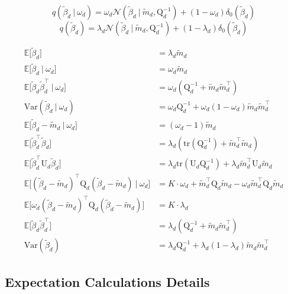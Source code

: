 \documentclass[twoside,11pt]{article}
\newcommand\given[1][]{\:#1\vert\:}
\newcommand{\transpose}[1]{#1^{\intercal}}
\newcommand{\E}{\mathbb{E}}
\newcommand{\betad}{\tilde{\beta}_d}
\newcommand{\umat}{\mathrm{U}}
\newcommand{\qmat}{\mathrm{Q}}
\newcommand{\qbeta}{\mathcal{N} \left( \betad \given \tilde{m}_d, \qmat_d^{-1} \right)}
\newcommand{\trace}[1]{\mathrm{tr} \left( #1 \right)}
\newcommand{\var}[1]{\mathrm{Var}\left(#1\right)}
\begin{document}
\begin{equation} \label{eq:qbeta_omega}
	q(\betad \given \omega_d) = \omega_d \qbeta + (1 - \omega_d) \delta_0(\betad)
\end{equation}
\begin{equation}  \label{eq:qbeta_marginal}
	q(\betad) = \lambda_d \qbeta + (1 - \lambda_d) \delta_0(\betad)
\end{equation}

\begin{align*}
	\E \Big[ \betad \Big] &= \lambda_d \tilde{m}_d \\
	\E \Big[ \betad \given \omega_d \Big] &=  \omega_d \tilde{m}_d \\
	\E \Big[ \betad \transpose{\betad} \given \omega_d \Big] &= \omega_d \left( \qmat_d^{-1} + \tilde{m}_d \transpose{\tilde{m}_d} \right) \\
	\var{\betad \given \omega_d} &= \omega_d \qmat_d^{-1} + \omega_d(1-\omega_d) \tilde{m}_d \transpose{\tilde{m}_d} \\
	\E\Big[ \betad - \tilde{m}_d \given \omega_d \Big] &= (\omega_d - 1) \tilde{m}_d \\
	\E \Big[ \transpose{\betad} \betad \Big] &= \lambda_d \left( \trace{\qmat_d^{-1}} + \transpose{\tilde{m}_d} \tilde{m}_d \right) \\
	\E \Big[ \transpose{\betad} \umat_d \betad \Big] &= \lambda_d \trace{\umat_d \qmat_d^{-1}} + \lambda_d \transpose{\tilde{m}_d} \umat_d \tilde{m}_d \\
	\E \Big[ \transpose{(\betad - \tilde{m}_d)} \qmat_{d}(\betad - \tilde{m}_d) \given \omega_d \Big] &= K \cdot \omega_d + \transpose{\tilde{m}_d}\qmat_d \tilde{m}_d - \omega_d \transpose{\tilde{m}_d}\qmat_d \tilde{m}_d\\
	\E \Big[ \omega_d \transpose{(\betad - \tilde{m}_d)} \qmat_{d}(\betad - \tilde{m}_d) \Big] &= K \cdot \lambda_d \\
	\E \Big[ \betad \transpose{\betad} \Big] &=  \lambda_d \left( \qmat_d^{-1} + \tilde{m}_d \transpose{\tilde{m}_d} \right) \\
	\var{\betad} &= \lambda_d \qmat_d^{-1} + \lambda_d(1 - \lambda_d) \tilde{m}_d \transpose{\tilde{m}_d}
\end{align*}

\subsection{Expectation Calculations Details}
\end{document}
